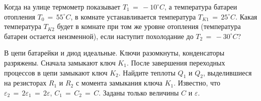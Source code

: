 \AddProb Когда на улице термометр показывает $T_1\,=\,-10^{\circ}C$, а температура батареи отопления $T_0\,=\,55^{\circ}C$, в комнате 
устанавливается температура $T_{K1}\,=\,25^{\circ}C$. Какая температура $T_{K2}$ будет в комнате при том же уровне отопления 
(температура батареи остается неизменной), если наступит похолодание до $T_2\,=\,-30^{\circ}C$?

\AddProb В цепи батарейки и диод идеальные. Ключи разомкнуты, конденсаторы разряжены. Сначала замыкают ключ $K_1$. 
После завершения переходных процессов в цепи замыкают ключ $K_2$. Найдите теплоты $Q_1$ и $Q_2$, выделившиеся на резисторах $R_1$ и $R_2$ с момента 
замыкания ключа $K_1$. Известно, что $\varepsilon_2\,=\,2\varepsilon_1\,=\,2\varepsilon$, $C_1\,=\,C_2\,=\,C$. Заданы только величины $C$ и $\varepsilon$.